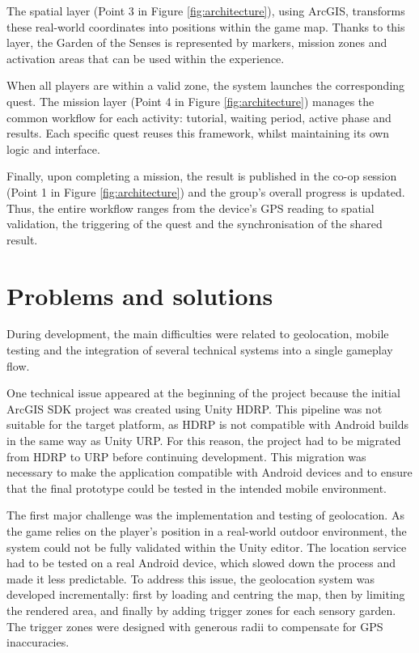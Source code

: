 The spatial layer (Point 3 in Figure \ref{fig:architecture}), using ArcGIS, transforms these real-world coordinates into positions within the game map. Thanks to this layer, the Garden of the Senses is represented by markers, mission zones and activation areas that can be used within the experience.

When all players are within a valid zone, the system launches the corresponding quest. The mission layer (Point 4 in Figure \ref{fig:architecture}) manages the common workflow for each activity: tutorial, waiting period, active phase and results. Each specific quest reuses this framework, whilst maintaining its own logic and interface.

Finally, upon completing a mission, the result is published in the co-op session (Point 1 in Figure \ref{fig:architecture}) and the group’s overall progress is updated. Thus, the entire workflow ranges from the device’s GPS reading to spatial validation, the triggering of the quest and the synchronisation of the shared result.

\section{Problems and solutions}
During development, the main difficulties were related to geolocation, mobile testing and the integration of several technical systems into a single gameplay flow.

One technical issue appeared at the beginning of the project because the initial ArcGIS SDK project was created using Unity HDRP. This pipeline was not suitable for the target platform, as HDRP is not compatible with Android builds in the same way as Unity URP. For this reason, the project had to be migrated from HDRP to URP before continuing development. This migration was necessary to make the application compatible with Android devices and to ensure that the final prototype could be tested in the intended mobile environment.

The first major challenge was the implementation and testing of geolocation. As the game relies on the player’s position in a real-world outdoor environment, the system could not be fully validated within the Unity editor. The location service had to be tested on a real Android device, which slowed down the process and made it less predictable. To address this issue, the geolocation system was developed incrementally: first by loading and centring the map, then by limiting the rendered area, and finally by adding trigger zones for each sensory garden. The trigger zones were designed with generous radii to compensate for GPS inaccuracies.

